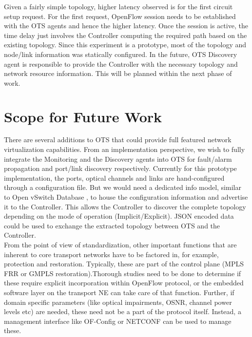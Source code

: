 \documentclass{sig-alternate-2013}
\begin{document}
 Given a fairly simple topology, higher latency observed is for the first circuit setup request. For the first request, OpenFlow session needs
 to be established with the OTS agents and hence the higher latency. Once the session is active, the time delay just involves the
 Controller computing the required path based on the existing topology. Since this experiment is a prototype, most of the topology
 and node/link information was statically configured. In the future, OTS Discovery agent is responsible to provide the Controller with the
 necessary topology and network resource information. This will be planned within the next phase of work.

\section{Scope for Future Work}
 \label{sec:future}
  There are several additions to OTS that could provide full featured network virtualization capabilities. From an
  implementation perspective, we wish to fully integrate the Monitoring and the Discovery agents into
  OTS for fault/alarm propagation and port/link discovery respectively. Currently for this prototype implementation, the ports, optical 
  channels and links are hand-configured through a configuration file.
  But we would need a dedicated info model, similar to Open vSwitch Database \cite{ovsdb}, to house
  the configuration information and advertise it to the Controller. This allows the Controller to discover
  the complete topology depending on the mode of operation (Implicit/Explicit). JSON encoded data 
  could be used to exchange the extracted topology between OTS and the Controller. \\

  From the point of view of standardization, other important functions that are inherent to core transport networks
  have to be factored in, for example, protection and restoration. Typically, these are part of the
  control plane (MPLS FRR or GMPLS restoration).Thorough studies need to be done to determine if
  these require explicit incorporation within OpenFlow protocol, or the embedded software layer on the transport NE can take care
  of that function. Further, if domain specific parameters (like optical impairments, OSNR, channel power levels etc)
  are needed, these need not be a part of the protocol itself. Instead, a management interface like OF-Config or
  NETCONF can be used to manage these.
\end{document}
